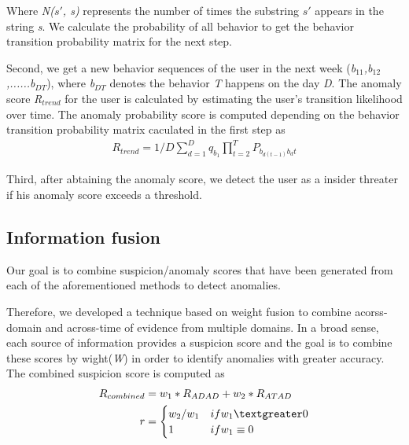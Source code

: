 \documentclass[conference]{IEEEtran}
\begin{document}
Where \emph{N($s\prime$, s)} represents the number of times the substring \emph{$s\prime$} appears in the string \emph{s}. We calculate the probability of all behavior to get the behavior transition probability matrix for the next step.

Second, we get a new behavior sequences of the user in the next week (\emph{b$_{11}$,b$_{12}$,......b$_{DT}$}), where \emph{b$_{DT}$} denotes the behavior \emph{T} happens on the day \emph{D}. The anomaly score \emph{R$_{trend}$} for the user is calculated by estimating the user’s transition likelihood over time. The anomaly probability score is computed depending on the behavior transition probability matrix caculated in the first step as
\begin{align}
R_{trend}=1/D\sum_{d=1}^D {q_{b_1}\prod_{t=2}^T P_{b_{d(t-1)}b_dt}}
\end{align}

Third, after abtaining the anomaly score, we detect the user as a insider threater if his anomaly score exceeds a threshold.
\subsection{Information fusion}

Our goal is to combine suspicion/anomaly scores that have been generated from each of the aforementioned methods to detect anomalies.

Therefore, we developed a technique based on weight fusion to combine acorss-domain and across-time of evidence from multiple domains. In a broad sense, each source of information provides a suspicion score and the goal is to combine these scores by wight(\emph{W}) in order to identify anomalies with greater accuracy. The combined suspicion score is computed as
\begin{align}
R_{combined}&= w_1*R_{ADAD}+w_2*R_{ATAD}\\
r&=\begin{cases}
w_2/w_1
&\mbox{if } w_1 \textgreater 0\\
1
&\mbox{if } w_1 \equiv 0\\
\end{cases}
\end{align}
\end{document}
